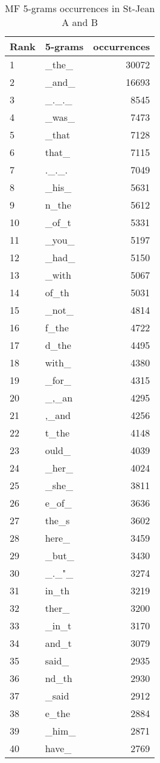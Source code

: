 \begin{table}[H]
  \centering
  \caption{MF 5-grams occurrences in St-Jean A and B}
  \label{tab:5_grams_occurences_st_jean}
  \begin{tabular}{l l r}
    \toprule
    Rank & 5-grams & occurrences \\
    \midrule
    1 & \_the\_ & 30072 \\
    2 & \_and\_ & 16693 \\
    3 & \_.\_.\_ & 8545 \\
    4 & \_was\_ & 7473 \\
    5 & \_that & 7128 \\
    6 & that\_ & 7115 \\
    7 & .\_.\_. & 7049 \\
    8 & \_his\_ & 5631 \\
    9 & n\_the & 5612 \\
    10 & \_of\_t & 5331 \\
    11 & \_you\_ & 5197 \\
    12 & \_had\_ & 5150 \\
    13 & \_with & 5067 \\
    14 & of\_th & 5031 \\
    15 & \_not\_ & 4814 \\
    16 & f\_the & 4722 \\
    17 & d\_the & 4495 \\
    18 & with\_ & 4380 \\
    19 & \_for\_ & 4315 \\
    20 & \_,\_an & 4295 \\
    21 & ,\_and & 4256 \\
    22 & t\_the & 4148 \\
    23 & ould\_ & 4039 \\
    24 & \_her\_ & 4024 \\
    25 & \_she\_ & 3811 \\
    26 & e\_of\_ & 3636 \\
    27 & the\_s & 3602 \\
    28 & here\_ & 3459 \\
    29 & \_but\_ & 3430 \\
    30 & \_.\_"\_ & 3274 \\
    31 & in\_th & 3219 \\
    32 & ther\_ & 3200 \\
    33 & \_in\_t & 3170 \\
    34 & and\_t & 3079 \\
    35 & said\_ & 2935 \\
    36 & nd\_th & 2930 \\
    37 & \_said & 2912 \\
    38 & e\_the & 2884 \\
    39 & \_him\_ & 2871 \\
    40 & have\_ & 2769 \\
    \bottomrule
  \end{tabular}
\end{table}

